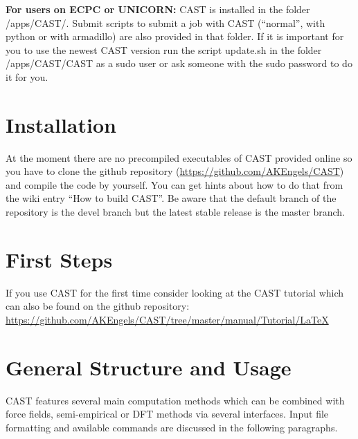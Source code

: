 \documentclass[10pt,a4paper]{article} %
\begin{document}
	\textbf{For users on ECPC or UNICORN:} CAST is installed in the folder /apps/CAST/. Submit scripts to submit a job with CAST (``normal'', with python or with armadillo) are also provided in that folder. If it is important for you to use the newest CAST version run the script update.sh in the folder /apps/CAST/CAST as a sudo user or ask someone with the sudo password to do it for you.

	
	\newpage

	\section{Installation}
	At the moment there are no precompiled executables of \ac{CAST} provided online so you have to clone the github repository (\url{https://github.com/AKEngels/CAST}) and compile the code by yourself. You can get hints about how to do that from the wiki entry ``How to build CAST''. Be aware that the default branch of the repository is the devel branch but the latest stable release is the master branch.

	\newpage
	
	\section{First Steps}
	
	If you use \ac{CAST} for the first time consider looking at the CAST tutorial which can also be found on the github repository:\\ \url{https://github.com/AKEngels/CAST/tree/master/manual/Tutorial/LaTeX}
	
	\newpage

	\section{General Structure and Usage}
	\ac{CAST} features several main computation methods which can be combined with force fields, semi-empirical or \ac{DFT} methods via several interfaces. Input file formatting and available commands are discussed in the following paragraphs.


\end{document}
